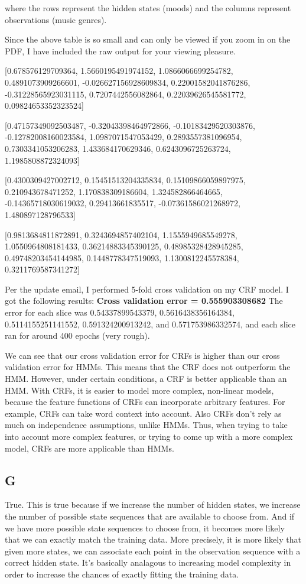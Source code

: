 \documentclass{article}
\begin{document}
where the rows represent the hidden states (moods) and the columns represent
observations (music genres).

Since the above table is so small and can only be viewed if you zoom in on the PDF,
I have included the raw output for your viewing pleasure.


[0.678576129709364, 1.5660195491974152, 1.0866066699254782, 0.4891073909266601, -0.026627156928609834, 0.22001582041876286, -0.31228565923031115, 0.7207442556082864, 0.22039626545581772, 0.09824653352323524]

[0.47157349092503487, -0.32043398464972866, -0.10183429520303876, -0.12782008160023584, 1.0987071547053429, 0.2893557381096954, 0.7303341053206283, 1.433684170629346, 0.6243096725263724, 1.1985808872324093]
\vspace{1mm}

[0.4300309427002712, 0.15451513204335834, 0.15109866059897975, 0.210943678471252, 1.170838309186604, 1.324582866464665, -0.14365718030619032, 0.29413661835517, -0.07361586021268972, 1.480897128796533]
\vspace{1mm}

[0.9813684811872891, 0.3243694857402104, 1.1555949685549278, 1.0550964808181433, 0.36214883345390125, 0.48985328428945285, 0.49748203454144985, 0.1448778347519093, 1.1300812245578384, 0.3211769587341272]
\vspace{1mm}

Per the update email, I performed 5-fold cross validation on my CRF model. I got
the following results:
\textbf{Cross validation error =  0.555903308682}
The error for each slice was 0.54337899543379, 0.5616438356164384, 0.5114155251141552, 0.591324200913242, and 0.571753986332574,
and each slice ran for around 400 epochs (very rough).

We can see that our cross validation error for CRFs is higher than our cross
validation error for HMMs. This means that the CRF does not outperform the HMM.
However, under certain conditions, a CRF is better applicable than an HMM.
With CRFs, it is easier to model more complex, non-linear models, because the feature
functions of CRFs can incorporate arbitrary features. For example, CRFs can
take word context into account. Also CRFs don't rely as much on independence assumptions,
unlike HMMs. Thus, when trying to take into account more complex features, or trying
to come up with a more complex model, CRFs are more applicable than HMMs.

\subsection*{G}
True. This is true because if we increase the number of hidden states, we increase
the number of possible state sequences that are available to choose from. And if
we have more possible state sequences to choose from, it becomes more likely that
we can exactly match the training data. More precisely, it is more likely that given
more states, we can associate each point in the observation sequence with a correct
hidden state. It's basically analagous to increasing
model complexity in order to increase the chances of exactly fitting the training data.
\end{document}

